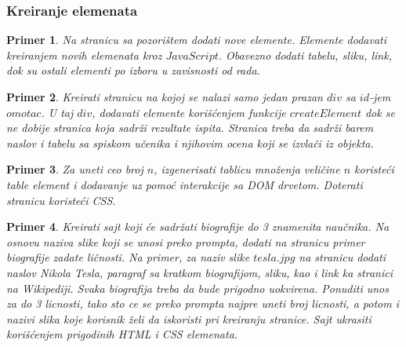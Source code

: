 \documentclass[a4paper]{article}
\newtheorem{primer}{Primer}[section]
\begin{document}
\subsubsection{Kreiranje elemenata}
\begin{primer}
Na stranicu sa pozorištem dodati nove elemente. Elemente dodavati kreiranjem novih elemenata kroz $JavaScript$. Obavezno dodati tabelu, sliku, link, dok su ostali elementi po izboru u zavisnosti od rada.
\end{primer}

\begin{primer}
Kreirati stranicu na kojoj se nalazi samo jedan prazan $div$ sa $id$-jem $omotac$. U taj $div$, dodavati elemente korišćenjem funkcije $createElement$ dok se ne dobije stranica koja sadrži rezultate ispita. Stranica treba da sadrži barem naslov i tabelu sa spiskom učenika i njihovim ocena koji se izvlači iz objekta.
\end{primer}

\begin{primer}
Za uneti ceo broj $n$, izgenerisati tablicu množenja veličine $n$ koristeći table element i dodavanje uz pomoć interakcije sa DOM drvetom. Doterati stranicu koristeći CSS.
\end{primer}

\begin{primer}
Kreirati sajt koji će sadržati biografije do 3 znamenita naučnika. Na osnovu naziva slike koji se unosi preko prompta, dodati na stranicu primer biografije zadate ličnosti. Na primer, za naziv slike $tesla.jpg$ na stranicu dodati naslov Nikola Tesla, paragraf sa kratkom biografijom, sliku, kao i link ka stranici na Wikipediji. Svaka biografija treba da bude prigodno uokvirena. Ponuditi unos za do 3 licnosti, tako sto ce se preko prompta najpre uneti broj licnosti, a potom i nazivi slika koje korisnik želi da iskoristi pri kreiranju stranice. Sajt ukrasiti korišćenjem prigodinih HTML i CSS elemenata.
\end{primer}
\end{document}
